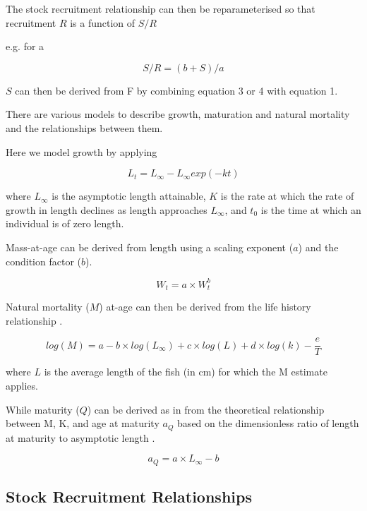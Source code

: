 \documentclass[preprint,authoryear,12pt]{elsarticle}
\begin{document}
The stock recruitment relationship can then be reparameterised so that recruitment $R$ is a function of $S/R$ 
 
e.g. for a \citet{beverton1956review}  
 
\begin{equation} 
S/R=(b+S)/a 	 
\end{equation}  
 
$S$ can then be derived from F by combining equation 3 or 4 with equation 1.  
 
There are various models to describe growth, maturation and natural mortality and the relationships between them. 
 
Here we model growth by applying \citep{von1957quantitative}   
 
\begin{equation} L_t = L_{\infty} - L_{\infty}exp(-kt) \end{equation} 
 
where $L_{\infty}$ is the asymptotic length attainable, $K$ is the rate at which the rate of growth in length declines as length approaches $L_{\infty}$, and $t_{0}$ is the time at 
which an individual is of zero length. 
 
Mass-at-age can be derived from length using a scaling exponent ($a$) and the condition factor ($b$). 
 
\begin{equation} W_t = a \times W_t^b \end{equation} 
 
 
Natural mortality ($M$) at-age can then be derived from the life history relationship \citet{gislason2008does}. 
 
\begin{equation} 
log(M) = a - b \times log(L_{\infty}) + c \times log(L) + d \times log(k) - \frac{e}{T} 
\end{equation}  
 
where $L$ is the average length of the fish (in cm) for which the M estimate applies. 
 
While maturity ($Q$) can be derived as in \citet{williams2003implications} from the theoretical relationship between M, K, and age at maturity $a_{Q}$  
based on the dimensionless ratio of length at maturity to asymptotic length \citep{beverton1992patterns}.  
 
\begin{equation} 
a_{Q}=a \times L_{\infty}-b 
\end{equation}  
 
\subsection{Stock Recruitment Relationships} 
 
\end{document}
